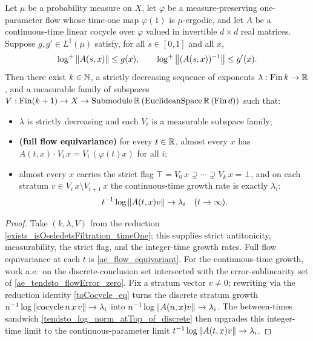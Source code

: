 \begin{theorem}\label{oseledets_flow}
  \leanok
  Let \( \mu \) be a probability measure on \( X \), let \( \varphi \) be a measure-preserving
  one-parameter flow whose time-one map \( \varphi(1) \) is \( \mu \)-ergodic, and let \( A \) be a
  continuous-time linear cocycle over \( \varphi \) valued in invertible \( d \times d \) real
  matrices. Suppose \( g, g' \in L^1(\mu) \) satisfy, for all \( s \in [0,1] \) and all \( x \),
  \[ \log^{+}\left\lVert A(s,x) \right\rVert \le g(x), \qquad \log^{+}\left\lVert (A(s,x))^{-1} \right\rVert \le g'(x). \]
  Then there exist \( k \in \mathbb{N} \), a strictly decreasing sequence of exponents
  \( \lambda : \mathrm{Fin}\,k \to \mathbb{R} \), and a measurable family of subspaces
  \( V : \mathrm{Fin}(k+1) \to X \to \mathrm{Submodule}\,\mathbb{R}\,(\mathrm{EuclideanSpace}\,\mathbb{R}\,(\mathrm{Fin}\,d)) \)
  such that:
  \begin{itemize}
    \item \( \lambda \) is strictly decreasing and each \( V_i \) is a measurable subspace family;
    \item \textbf{(full flow equivariance)} for every \( t \in \mathbb{R} \), almost every \( x \) has
      \( A(t,x) \cdot V_i\,x = V_i\,(\varphi(t)x) \) for all \( i \);
    \item almost every \( x \) carries the strict flag
      \( \top = V_0\,x \supsetneq \cdots \supsetneq V_k\,x = \bot \), and on each stratum
      \( v \in V_i\,x \setminus V_{i+1}\,x \) the continuous-time growth rate is exactly
      \( \lambda_i \):
      \[ t^{-1}\log\left\lVert A(t,x)v \right\rVert \to \lambda_i \quad (t \to \infty). \]
  \end{itemize}
\end{theorem}
\begin{proof}\leanok
  Take \( (k, \lambda, V) \) from the reduction \ref{exists_isOseledetsFiltration_timeOne}; this
  supplies strict antitonicity, measurability, the strict flag, and the integer-time growth rates.
  Full flow equivariance at each \( t \) is \ref{ae_flow_equivariant}. For the continuous-time
  growth, work a.e.\ on the discrete-conclusion set intersected with the error-sublinearity set of
  \ref{ae_tendsto_flowError_zero}. Fix a stratum vector \( v \neq 0 \); rewriting via the reduction
  identity \ref{toCocycle_eq} turns the discrete stratum growth
  \( n^{-1}\log\left\lVert \mathrm{cocycle}\,n\,x\,v \right\rVert \to \lambda_i \) into
  \( n^{-1}\log\left\lVert A(n,x)v \right\rVert \to \lambda_i \). The between-times sandwich
  \ref{tendsto_log_norm_atTop_of_discrete} then upgrades this integer-time limit to the
  continuous-parameter limit \( t^{-1}\log\left\lVert A(t,x)v \right\rVert \to \lambda_i \).
\end{proof}
